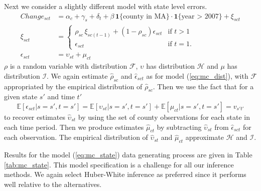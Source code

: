 \documentclass[12pt]{article}
\begin{document}
Next we consider a slightly different model with state level errors. 
\begin{align}
\label{eq:mc_state}
	Change_{sct} & = \alpha_c + \gamma_s + \delta_t + \beta \, \mathbf{1}\{\text{county in MA}\} \cdot \mathbf{1}\{\text{year > 2007}\} + \xi_{sct} \\
	\xi_{sct} & = 
	\begin{cases}\rho_{sc} \, \xi_{sc(t-1)} + (1-\rho_{sc}) \epsilon_{sct} &\mbox{if } t > 1 \nonumber \\ 
		\epsilon_{sct}  & \mbox{if } t = 1. \end{cases} \nonumber \\
 	\epsilon_{sct} & = \upsilon_{st} + \mu_{ct}		\nonumber
\end{align}
$\rho$ is a random variable with distribution $\mathcal{F}$, $\upsilon$ has distribution $\mathcal{H}$ and $\mu$ has distribution $\mathcal{I}$. We again estimate $\hat{\rho}_{sc}$ and $\hat{\epsilon}_{sct}$ as for model (\ref{eq:mc_dist}), with $\mathcal{F}$ appropriated by the empirical distribution of $\hat{\rho}_{sc}$. Then we use the fact that for a given state $s'$ and time $t'$
$$\mathbb{E}[\epsilon_{sct}|s=s', t=s'] = \mathbb{E}[\upsilon_{st}|s=s', t=s'] + \mathbb{E}[\mu_{ct}|s=s', t=s']=v_{s't'}$$
to recover estimates $\hat{\upsilon}_{st}$ by using the set of county observations for each state in each time period. Then we produce estimates  $\hat{\mu}_{ct}$ by subtracting $\hat{\upsilon}_{st}$ from $\hat{\epsilon}_{sct}$ for each observation. The empirical distribution of $\hat{\upsilon}_{st}$ and $\hat{\mu}_{ct}$ approximate  $\mathcal{H}$ and $\mathcal{I}$. 

Results for the model (\ref{eq:mc_state}) data generating process are given in Table \ref{tab:mc_state}. This model specification is a challenge for all our inference methods. We again select Huber-White inference as preferred since it performs well relative to the alternatives. 
\end{document}

